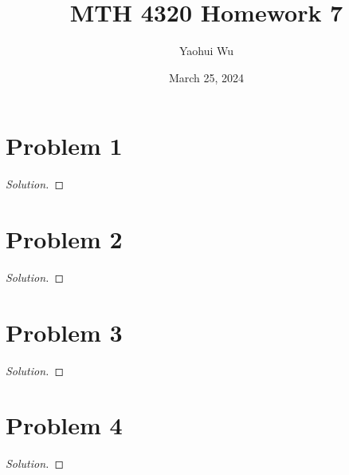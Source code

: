 \documentclass[12pt]{article}
\title{MTH 4320 Homework 7}
\author{Yaohui Wu}
\date{March 25, 2024}
\newenvironment*{solution}{\begin{proof}[Solution]}{\end{proof}}
\begin{document}
\maketitle
\section*{Problem 1}
\begin{solution}
    
\end{solution}
\section*{Problem 2}
\begin{solution}
    
\end{solution}
\section*{Problem 3}
\begin{solution}
    
\end{solution}
\section*{Problem 4}
\begin{solution}
    
\end{solution}
\end{document}
